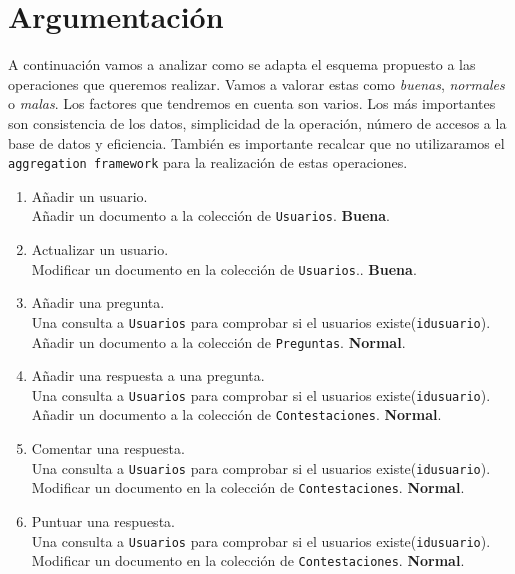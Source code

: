 \documentclass{article}
\begin{document}
  \section{Argumentación}
    A continuación vamos a analizar como se adapta el esquema propuesto a las
    operaciones que queremos realizar. Vamos a valorar estas como
    \emph{buenas}, \emph{normales} o \emph{malas}. Los factores que tendremos
    en cuenta son varios. Los más importantes son consistencia de los datos,
    simplicidad de la operación, número de accesos a la base de datos y
    eficiencia. También es importante recalcar que no utilizaramos el
    \texttt{aggregation framework} para la realización de estas operaciones.
    \par
    \begin{enumerate}
      \item Añadir un usuario. \\ 
        Añadir un documento a la colección de \texttt{Usuarios}. \textbf{Buena}.
      \item Actualizar un usuario. \\
        Modificar un documento en la colección de \texttt{Usuarios}.. \textbf{Buena}.
      \item Añadir una pregunta. \\
        Una consulta a \texttt{Usuarios} para comprobar si el usuarios existe(\texttt{idusuario}).\\  
        Añadir un documento a la colección de \texttt{Preguntas}. \textbf{Normal}.      
      \item Añadir una respuesta a una pregunta. \\
        Una consulta a \texttt{Usuarios} para comprobar si el usuarios existe(\texttt{idusuario}).\\  
        Añadir un documento a la colección de \texttt{Contestaciones}. \textbf{Normal}.
      \item Comentar una respuesta. \\
        Una consulta a \texttt{Usuarios} para comprobar si el usuarios existe(\texttt{idusuario}).\\  
        Modificar un documento en la colección de \texttt{Contestaciones}. \textbf{Normal}.
      \item Puntuar una respuesta. \\
        Una consulta a \texttt{Usuarios} para comprobar si el usuarios existe(\texttt{idusuario}).\\  
        Modificar un documento en la colección de \texttt{Contestaciones}. \textbf{Normal}.

\end{enumerate}
\end{document}
